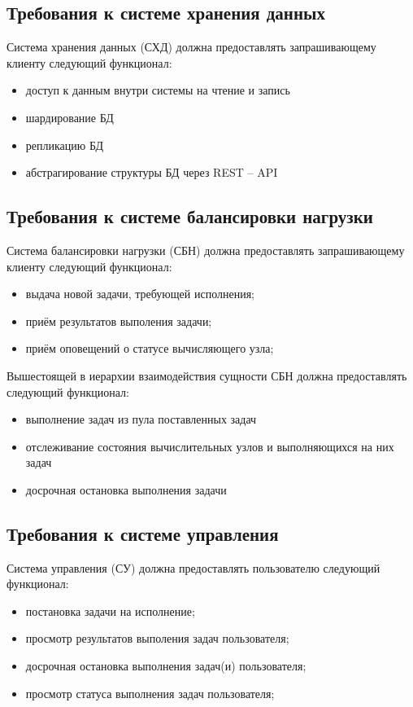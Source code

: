 \documentclass[a4paper,12pt]{report}
\numberwithin{equation}{section}
\begin{document}
\subsection{Требования к системе хранения данных}
Система хранения данных (СХД) должна предоставлять запрашивающему клиенту следующий функционал:
\begin{itemize}
  \item доступ к данным внутри системы на чтение и запись
  \item шардирование БД
  \item репликацию БД
  \item абстрагирование структуры БД через REST -- API
\end{itemize}

\subsection{Требования к системе балансировки нагрузки}
Система балансировки нагрузки (СБН) должна предоставлять запрашивающему клиенту следующий функционал:
\begin{itemize}
  \item выдача новой задачи, требующей исполнения;
  \item приём результатов выполения задачи;
  \item приём оповещений о статусе вычисляющего узла;
\end{itemize}

Вышестоящей в иерархии взаимодействия сущности СБН должна предоставлять следующий функционал:
\begin{itemize}
  \item выполнение задач из пула поставленных задач
  \item отслеживание состояния вычислительных узлов и выполняющихся на них задач
  \item досрочная остановка выполнения задачи
\end{itemize}

\subsection{Требования к системе управления}
Система управления (СУ) должна предоставлять пользователю следующий функционал:
\begin{itemize}
  \item постановка задачи на исполнение;
  \item просмотр результатов выполения задач пользователя;
  \item досрочная остановка выполнения задач(и) пользователя;
  \item просмотр статуса выполнения задач пользователя;
\end{itemize}
\end{document}
